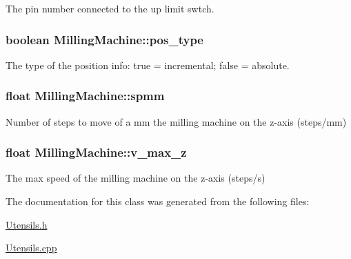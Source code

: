 The pin number connected to the up limit swtch. 

\hypertarget{class_milling_machine_a46ae1c0f1d5c73fc3888c231a1a8b426}{
\subsubsection[{pos\+\_\+type}]{\setlength{\rightskip}{0pt plus 5cm}boolean Milling\+Machine\+::pos\+\_\+type\hspace{0.3cm}{\ttfamily [private]}}}\label{class_milling_machine_a46ae1c0f1d5c73fc3888c231a1a8b426}


The type of the position info\+: true = incremental; false = absolute. 

\hypertarget{class_milling_machine_a774f8f3491b4888cd9418c745e922199}{
\subsubsection[{spmm}]{\setlength{\rightskip}{0pt plus 5cm}float Milling\+Machine\+::spmm\hspace{0.3cm}{\ttfamily [private]}}}\label{class_milling_machine_a774f8f3491b4888cd9418c745e922199}


Number of steps to move of a mm the milling machine on the z-\/axis (steps/mm) 

\hypertarget{class_milling_machine_ad412aad77721bcbc65de8072d7db7b3f}{
\subsubsection[{v\+\_\+max\+\_\+z}]{\setlength{\rightskip}{0pt plus 5cm}float Milling\+Machine\+::v\+\_\+max\+\_\+z\hspace{0.3cm}{\ttfamily [private]}}}\label{class_milling_machine_ad412aad77721bcbc65de8072d7db7b3f}


The max speed of the milling machine on the z-\/axis (steps/s) 



The documentation for this class was generated from the following files\+:\begin{DoxyCompactItemize}
\item 
\hyperlink{_utensils_8h}{Utensils.\+h}\item 
\hyperlink{_utensils_8cpp}{Utensils.\+cpp}\end{DoxyCompactItemize}
